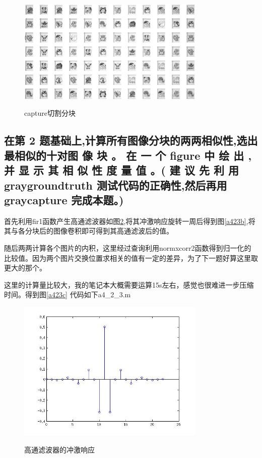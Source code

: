 \documentclass{ctexart}
\begin{document}
\begin{figure}
    \centering
    \includegraphics[width=0.8\textwidth]{process/a422e.jpg}\\
    \caption{capture切割分块\label{a422e}}
\end{figure}

\subsection{
在第 2 题基础上,计算所有图像分块的两两相似性,选出最相似的十对图
像 块 。 在 一 个 figure 中 绘 出 , 并 显 示 其 相 似 性 度 量 值 。( 建 议 先 利 用
graygroundtruth 测试代码的正确性,然后再用 graycapture 完成本题。)
}
首先利用fir1函数产生高通滤波器如图\ref{a423a},将其冲激响应旋转一周后得到图\ref{a423b},将其与各分块后的图像卷积即可得到其高通滤波后的值。

随后两两计算各个图片的内积，这里经过查询利用normxcorr2函数得到归一化的比较值。因为两个图片交换位置求相关的值有一定的差异，为了下一题好算这里取更大的那个。

这里的计算量比较大，我的笔记本大概需要运算15s左右，感觉也很难进一步压缩时间。得到图\ref{a423c}
代码如下a4\_2\_3.m

\begin{figure}
    \centering
    \includegraphics[width=0.8\textwidth]{process/a423a.jpg}\\
    \caption{高通滤波器的冲激响应\label{a423a}}
\end{figure}
\end{document}
